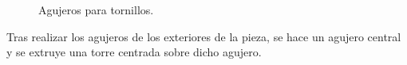\begin{figure}[H]
    \centering
    \hfill
    \caption{Agujeros para tornillos.}
    \label{fig:agujeros_tornillos_tapa_superior}
\end{figure}

Tras realizar los agujeros de los exteriores de la pieza, se hace un agujero central y se extruye una torre centrada sobre dicho agujero.

